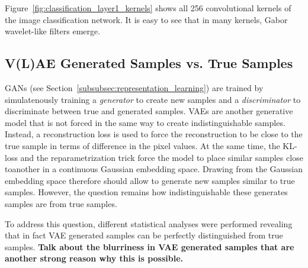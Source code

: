 Figure~\ref{fig:classification_layer1_kernels} shows all 256 convolutional kernels of the image classification network.
It is easy to see that in many kernels, Gabor wavelet-like filters emerge.

\subsection{V(L)AE Generated Samples vs. True Samples}\label{subsec:vae-generated-samples-vs-true-samples}
\acp{GAN} (see Section~\ref{subsubsec:representation_learning}) are trained by simulatenously training a \textit{generator} to create new samples and a \textit{discriminator} to discriminate between true and generated samples.
\acp{VAE} are another generative model that is not forced in the same way to create indistinguishable samples.
Instead, a reconstruction loss is used to force the reconstruction to be close to the true sample in terms of difference in the pixel values.
At the same time, the \ac{KL}-loss and the reparametrization trick force the model to place similar samples close toanother in a continuous Gaussian embedding space.
Drawing from the Gaussian embedding space therefore should allow to generate new samples similar to true samples.
However, the question remains how indistinguishable these generates samples are from true samples.

To address this question, different statistical analyses were performed revealing that in fact VAE generated samples can be perfectly distinguished from true samples.
\textbf{Talk about the blurriness in VAE generated samples that are another strong reason why this is possible.}

